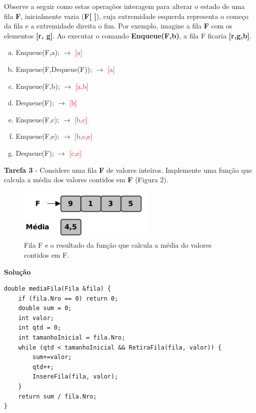 \documentclass{article}
\begin{document}
\par
\noindent
Observe a seguir como estas operações interagem para alterar o estado de uma fila \textbf{F}, inicialmente vazia (\textbf{F[ ]}), cuja extremidade esquerda representa o começo da fila e a extremidade direita o fim. Por exemplo, imagine a fila \textbf{F} com os elementos \textbf{[r, g]}. Ao executar o comando \textbf{Enqueue(F,b)}, a fila F ficaria \textbf{[r,g,b]}.
\begin{enumerate}[(a)]
    \item Enqueue(F,a); \( \rightarrow \) \textcolor{red}{[a]}
    \item Enqueue(F,Dequeue(F)); \( \rightarrow \) \textcolor{red}{[a]}
    \item Enqueue(F,b); \( \rightarrow \) \textcolor{red}{[a,b]}
    \item Dequeue(F); \( \rightarrow \) \textcolor{red}{[b]}
    \item Enqueue(F,c); \( \rightarrow \) \textcolor{red}{[b,c]}
    \item Enqueue(F,e); \( \rightarrow \) \textcolor{red}{[b,c,e]}
    \item Dequeue(F); \( \rightarrow \) \textcolor{red}{[c,e]}
\end{enumerate}

\bigskip

\par
\noindent
\textbf{Tarefa 3} - Considere uma fila \textbf{F} de valores inteiros. Implemente uma função que calcula a média dos valores contidos em \textbf{F} (Figura 2).
\begin{figure}[h!]
    \clearpage
    \centering
    \includegraphics[width=0.5\linewidth]{fila/2.PNG}
    \caption{ Fila F e o resultado da função que calcula a média do valores contidos em F.}
\end{figure}

\bigskip
\par
\noindent
\textbf{Solução}
\begin{lstlisting}
double mediaFila(Fila &fila) {
    if (fila.Nro == 0) return 0;
    double sum = 0;
    int valor;
    int qtd = 0;
    int tamanhoInicial = fila.Nro;
    while (qtd < tamanhoInicial && RetiraFila(fila, valor)) {
        sum+=valor;
        qtd++;
        InsereFila(fila, valor);
    }
    return sum / fila.Nro;
}
\end{lstlisting}
\end{document}
